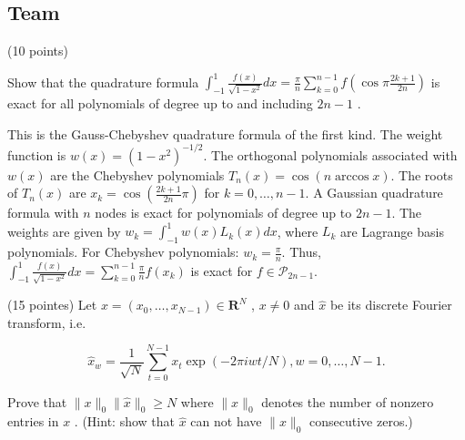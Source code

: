 \subsection{Team}

\begin{exercise}
\label{applied:2019:5}
(10 points)

Show that the quadrature formula $\int _ { - 1 } ^ { 1 } { \frac { f ( x ) } { \sqrt { 1 - x ^ { 2 } } } } d x = { \frac { \pi } { n } } \sum _ { k = 0 } ^ { n - 1 } f \left( \cos \pi { \frac { 2 k + 1 } { 2 n } } \right)$ is exact for all polynomials of degree up to and including $2 n - 1$ .
\end{exercise}

\begin{solution}
This is the Gauss-Chebyshev quadrature formula of the first kind. The weight function is $w(x) = (1-x^2)^{-1/2}$. The orthogonal polynomials associated with $w(x)$ are the Chebyshev polynomials $T_n(x) = \cos(n \arccos x)$.
The roots of $T_n(x)$ are $x_k = \cos\left(\frac{2k+1}{2n}\pi\right)$ for $k=0, \dots, n-1$.
A Gaussian quadrature formula with $n$ nodes is exact for polynomials of degree up to $2n-1$.
The weights are given by $w_k = \int_{-1}^1 w(x) L_k(x) dx$, where $L_k$ are Lagrange basis polynomials. For Chebyshev polynomials:
$w_k = \frac{\pi}{n}$.
Thus, $\int_{-1}^1 \frac{f(x)}{\sqrt{1-x^2}} dx = \sum_{k=0}^{n-1} \frac{\pi}{n} f(x_k)$ is exact for $f \in \mathcal{P}_{2n-1}$.
\end{solution}

\begin{exercise}
\label{applied:2019:6}
(15 pointes) Let $x = ( x _ { 0 } , \ldots , x _ { N - 1 } ) \in \mathbf { R } ^ { N }$ , $x \neq 0$ and $\hat { x }$ be its discrete Fourier transform, i.e.

\[
\hat {x} _ {w} = \frac {1}{\sqrt {N}} \sum_ {t = 0} ^ {N - 1} x _ {t} \exp (- 2 \pi i w t / N), w = 0, \dots , N - 1.
\]

Prove that $\| x \| _ { 0 } \| \hat { x } \| _ { 0 } \geqslant N$ where $\| x \| _ { 0 }$ denotes the number of nonzero entries in $x$ . (Hint: show that $\hat { x }$ can not have $\| x \| _ { 0 }$ consecutive zeros.)
\end{exercise}

